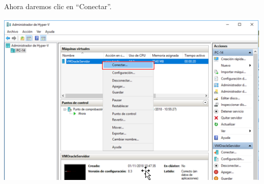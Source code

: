 Ahora daremos clic en “Conectar”.
	\begin{center}
		\includegraphics[width=17.5cm]{./Imagenes/26} 
	\end{center} 



